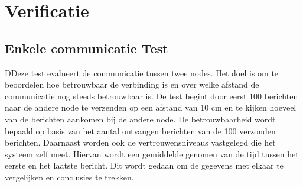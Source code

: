 \section{Verificatie}


\subsection{Enkele communicatie Test}
DDeze test evalueert de communicatie tussen twee nodes. Het doel is om te beoordelen hoe betrouwbaar de verbinding is en over welke afstand de communicatie nog steeds betrouwbaar is. De test begint door eerst 100 berichten naar de andere node te verzenden op een afstand van 10 cm en te kijken hoeveel van de berichten aankomen bij de andere node. De betrouwbaarheid wordt bepaald op basis van het aantal ontvangen berichten van de 100 verzonden berichten. Daarnaast worden ook de vertrouwensniveaus vastgelegd die het systeem zelf meet. Hiervan wordt een gemiddelde genomen van de tijd tussen het eerste en het laatste bericht. Dit wordt gedaan om de gegevens met elkaar te vergelijken en conclusies te trekken.

